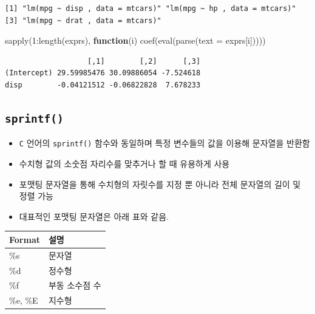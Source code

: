\documentclass[
  11pt,
]{krantz}
\newenvironment{Shaded}{\begin{snugshade}}{\end{snugshade}}
\newcommand{\AttributeTok}[1]{\textcolor[rgb]{0.61,0.61,0.61}{#1}}
\newcommand{\ControlFlowTok}[1]{\textcolor[rgb]{0.27,0.27,0.27}{\textbf{#1}}}
\newcommand{\DecValTok}[1]{\textcolor[rgb]{0.06,0.06,0.06}{#1}}
\newcommand{\FunctionTok}[1]{\textcolor[rgb]{0,0,0}{#1}}
\newcommand{\NormalTok}[1]{#1}
\newcommand{\SpecialCharTok}[1]{\textcolor[rgb]{0,0,0}{#1}}
\providecommand{\tightlist}{%
  \setlength{\itemsep}{0pt}\setlength{\parskip}{0pt}}
\begin{document}
\begin{verbatim}
[1] "lm(mpg ~ disp , data = mtcars)" "lm(mpg ~ hp , data = mtcars)"  
[3] "lm(mpg ~ drat , data = mtcars)"
\end{verbatim}

\begin{Shaded}
\begin{Highlighting}[]
\FunctionTok{sapply}\NormalTok{(}\DecValTok{1}\SpecialCharTok{:}\FunctionTok{length}\NormalTok{(exprs), }\ControlFlowTok{function}\NormalTok{(i) }\FunctionTok{coef}\NormalTok{(}\FunctionTok{eval}\NormalTok{(}\FunctionTok{parse}\NormalTok{(}\AttributeTok{text =}\NormalTok{ exprs[i]))))}
\end{Highlighting}
\end{Shaded}

\begin{verbatim}
                   [,1]        [,2]      [,3]
(Intercept) 29.59985476 30.09886054 -7.524618
disp        -0.04121512 -0.06822828  7.678233
\end{verbatim}

\normalsize

\hypertarget{sprintf}{%
\subsection{\texorpdfstring{\textbf{\texttt{sprintf()}}}{sprintf()}}\label{sprintf}}

\begin{itemize}
\tightlist
\item
  \texttt{C} 언어의 \texttt{sprintf()} 함수와 동일하며 특정 변수들의 값을 이용해 문자열을 반환함
\item
  수치형 값의 소숫점 자리수를 맞추거나 할 때 유용하게 사용
\item
  포맷팅 문자열을 통해 수치형의 자릿수를 지정 뿐 아니라 전체 문자열의 길이 및 정렬 가능
\item
  대표적인 포맷팅 문자열은 아래 표와 같음.
\end{itemize}

\footnotesize

\begin{tabular}{l|l}
\hline
Format & 설명\\
\hline
\%s & 문자열\\
\hline
\%d & 정수형\\
\hline
\%f & 부동 소수점 수\\
\hline
\%e, \%E & 지수형\\
\hline
\end{tabular}
\end{document}
